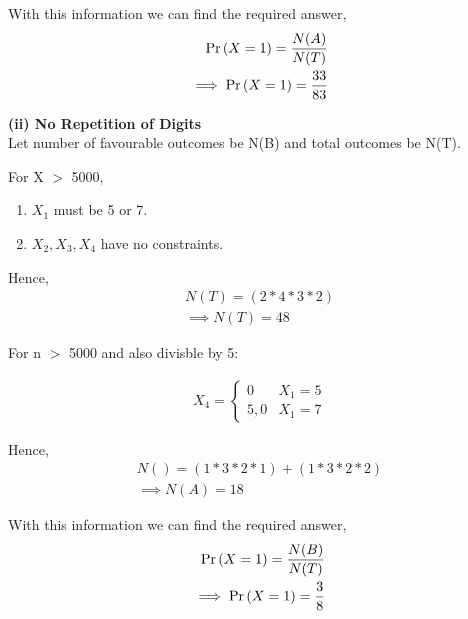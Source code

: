 \documentclass{article}
\begin{document}
With this information we can find the required answer,
\begin{align}
	\Pr\left(X=1\right)=\frac{N(A)}{N(T)}\\
	\implies \Pr\left(X=1\right)=\frac{33}{83}
\end{align}



\textbf{(ii) No Repetition of Digits}\\
Let number of favourable outcomes be N(B) and total outcomes be N(T).

For X $>$ 5000,

\begin{enumerate}
	\item $X_{1}$ must be 5 or 7.\\
	\item $X_{2},X_{3},X_{4}$ have no constraints.
\end{enumerate}

Hence,
\begin{align}
	N(T)=(2*4*3*2) \\
	\implies N(T)=48
\end{align}

For n $>$ 5000 and also divisble by 5:

\begin{align}
	X_{4} = \begin{cases}
		0 & X_{1}=5 \\
		5,0 & X_{1}=7
	\end{cases}
\end{align}

Hence,
\begin{align}
	N()=(1*3*2*1)+(1*3*2*2) \\
	\implies N(A)=18
\end{align}

With this information we can find the required answer,
\begin{align}
	\Pr\left(X=1\right)=\frac{N(B)}{N(T)}\\
	\implies \Pr\left(X=1\right)=\frac{3}{8}
\end{align}
\end{document}
